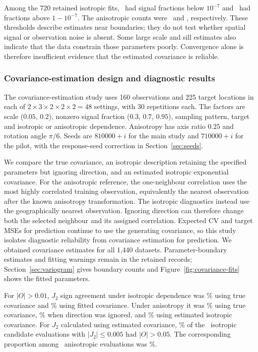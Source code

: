 \documentclass[11pt,a4paper]{article}
\begin{document}
Among the 720 retained isotropic fits, \BoundaryIsoLow\ had signal fractions below $10^{-7}$ and \BoundaryIsoHigh\ had fractions above $1-10^{-7}$. The anisotropic counts were \BoundaryAnisoLow\ and \BoundaryAnisoHigh, respectively. These thresholds describe estimates near boundaries; they do not test whether spatial signal or observation noise is absent. Some large scale and sill estimates also indicate that the data constrain those parameters poorly. Convergence alone is therefore insufficient evidence that the estimated covariance is reliable.

\subsubsection{Covariance-estimation design and diagnostic results}
\label{sec:covariance-diagnostics}
The covariance-estimation study uses 160 observations and 225 target locations in each of $2\times3\times2\times2\times2=48$ settings, with 30 repetitions each. The factors are scale ($0.05$, $0.2$), nonzero signal fraction ($0.3$, $0.7$, $0.95$), sampling pattern, target and isotropic or anisotropic dependence. Anisotropy has axis ratio $0.25$ and rotation angle $\pi/6$. Seeds are $810000+i$ for the main study and $710000+i$ for the pilot, with the response-seed correction in Section~\ref{sec:seeds}.

We compare the true covariance, an isotropic description retaining the specified parameters but ignoring direction, and an estimated isotropic exponential covariance. For the anisotropic reference, the one-neighbour correlation uses the most highly correlated training observation, equivalently the nearest observation after the known anisotropy transformation. The isotropic diagnostics instead use the geographically nearest observation. Ignoring direction can therefore change both the selected neighbour and its assigned correlation. Expected CV and target MSEs for prediction continue to use the generating covariance, so this study isolates diagnostic reliability from covariance estimation for prediction. We obtained covariance estimates for all 1,440 datasets. Parameter-boundary estimates and fitting warnings remain in the retained records; Section~\ref{sec:variogram} gives boundary counts and Figure~\ref{fig:covariance-fits} shows the fitted parameters.

For $|O|>0.01$, $J_2$ sign agreement under isotropic dependence was \SensIsoTrue\% using true covariance and \SensIsoEst\% using fitted covariance. Under anisotropy it was \SensAnisoTrue\% using true covariance, \SensAnisoNominal\% when direction was ignored, and \SensAnisoEst\% using estimated isotropic covariance. For $J_2$ calculated using estimated covariance, \SmallGapIso\% of the \SmallCountIso\ isotropic candidate evaluations with $|J_2|\leq0.005$ had $|O|>0.05$. The corresponding proportion among \SmallCountAniso\ anisotropic evaluations was \SmallGapAniso\%.
\end{document}

